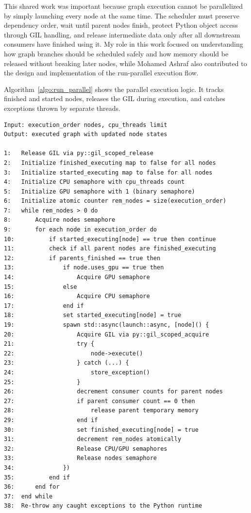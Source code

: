 \documentclass[12pt,a4paper,oneside]{report}
\begin{document}
This shared work was important because graph execution cannot be parallelized by simply launching every node at the same time. The scheduler must preserve dependency order, wait until parent nodes finish, protect Python object access through GIL handling, and release intermediate data only after all downstream consumers have finished using it. My role in this work focused on understanding how graph branches should be scheduled safely and how memory should be released without breaking later nodes, while Mohamed Ashraf also contributed to the design and implementation of the run-parallel execution flow.

Algorithm~\ref{algo:run_parallel} shows the parallel execution logic. It tracks finished and started nodes, releases the GIL during execution, and catches exceptions thrown by separate threads.

\begin{lstlisting}[style=algostyle,caption={Parallel Execution Engine in C++},label={algo:run_parallel}]
Input: execution_order nodes, cpu_threads limit
Output: executed graph with updated node states

1:   Release GIL via py::gil_scoped_release
2:   Initialize finished_executing map to false for all nodes
3:   Initialize started_executing map to false for all nodes
4:   Initialize CPU semaphore with cpu_threads count
5:   Initialize GPU semaphore with 1 (binary semaphore)
6:   Initialize atomic counter rem_nodes = size(execution_order)
7:   while rem_nodes > 0 do
8:       Acquire nodes semaphore
9:       for each node in execution_order do
10:          if started_executing[node] == true then continue
11:          check if all parent nodes are finished_executing
12:          if parents_finished == true then
13:              if node.uses_gpu == true then
14:                  Acquire GPU semaphore
15:              else
16:                  Acquire CPU semaphore
17:              end if
18:              set started_executing[node] = true
19:              spawn std::async(launch::async, [node]() {
20:                  Acquire GIL via py::gil_scoped_acquire
21:                  try {
22:                      node->execute()
23:                  } catch (...) {
24:                      store_exception()
25:                  }
26:                  decrement consumer counts for parent nodes
27:                  if parent consumer count == 0 then
28:                      release parent temporary memory
29:                  end if
30:                  set finished_executing[node] = true
31:                  decrement rem_nodes atomically
32:                  Release CPU/GPU semaphores
33:                  Release nodes semaphore
34:              })
35:          end if
36:      end for
37:  end while
38:  Re-throw any caught exceptions to the Python runtime
\end{lstlisting}
\end{document}
